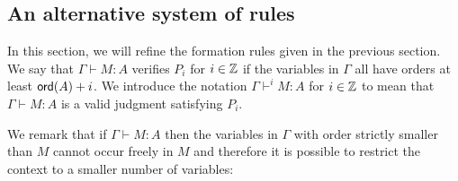 \subsection{An alternative system of rules}


In this section, we will refine the formation rules
given in the previous section. We say that $\Gamma \vdash M : A$ verifies $P_i$ for $i \in \mathbb{Z}$ if the
variables in $\Gamma$ all have orders at least ${\sf ord}(A)+i$. We introduce the notation $\Gamma \vdash^{i} M : A$ for $i \in
\mathbb{Z}$ to mean that $\Gamma \vdash M : A$ is a valid judgment satisfying $P_i$.


We remark that if $\Gamma \vdash M : A$ then the variables in $\Gamma$ with order
strictly smaller than $M$ cannot occur freely in $M$ and therefore it is possible to restrict
the context to a smaller number of variables:

